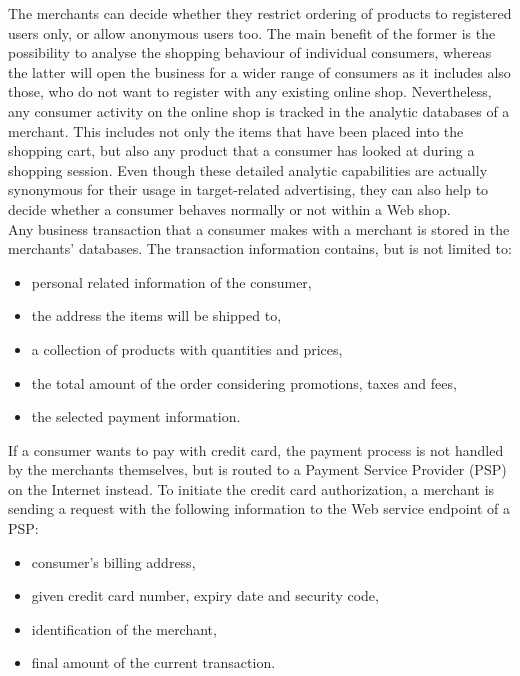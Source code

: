 The merchants can decide whether they restrict ordering of products to registered users only, or allow anonymous users too. The main benefit of the former is the possibility to analyse the shopping behaviour of individual consumers, whereas the latter will open the business for a wider range of consumers as it includes also those, who do not want to register with any existing online shop. Nevertheless, any consumer activity on the online shop is tracked in the analytic databases of a merchant. This includes not only the items that have been placed into the shopping cart, but also any product that a consumer has looked at during a shopping session. Even though these detailed analytic capabilities are actually synonymous for their usage in target-related advertising, they can also help to decide whether a consumer behaves normally or not within a Web shop. \\

Any business transaction that a consumer makes with a merchant is stored in the merchants' databases. The transaction information contains, but is not limited to:\@

\begin{itemize}
		\item personal related information of the consumer,
		\item the address the items will be shipped to,
		\item a collection of products with quantities and prices,
		\item the total amount of the order considering promotions, taxes and fees,
		\item the selected payment information.
\end{itemize}

If a consumer wants to pay with credit card, the payment process is not handled by the merchants themselves, but is routed to a Payment Service Provider (\gls{PSP}) on the Internet instead. To initiate the credit card authorization, a merchant is sending a request with the following information to the Web service endpoint of a \gls{PSP}: \@

\begin{itemize}
    \item consumer's billing address,
    \item given credit card number, expiry date and security code,
    \item identification of the merchant,
    \item final amount of the current transaction.
\end{itemize}

